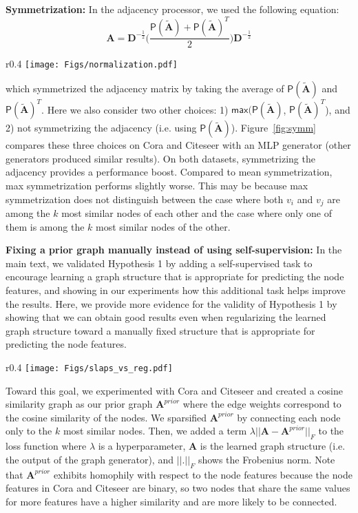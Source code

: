 \documentclass{article}
\def\mA{{\bm{A}}}
\def\mD{{\bm{D}}}
\newcommand{\func}[1]{\ensuremath{\mathsf{#1}}}
\begin{document}
\textbf{Symmetrization:} In the adjacency processor, we used the following equation:
\begin{equation*}
    \mA = \mD^{-\frac{1}{2}}\Big(\frac{\func{P}(\tilde{\mA})+\func{P}(\tilde{\mA})^T}{2}\Big)\mD^{-\frac{1}{2}} 
\end{equation*}
\begin{wrapfigure}{r}{0.4\columnwidth}
   \texttt{[image: Figs/normalization.pdf]}
   \caption{\label{fig:symm} The performance of SLAPS on Cora and Citeseer with different adjacency symmetrizations.
   }
\end{wrapfigure}
which symmetrized the adjacency matrix by taking the average of $\func{P}(\tilde{\mA})$ and $\func{P}(\tilde{\mA})^T$. Here we also consider two other choices: 1) $\func{max}(\func{P}(\tilde{\mA})$, $\func{P}(\tilde{\mA})^T$), and 2) not symmetrizing the adjacency (i.e. using $\func{P}(\tilde{\mA})$).
Figure~\ref{fig:symm} compares these three choices on Cora and Citeseer with an MLP generator (other generators produced similar results). On both datasets, symmetrizing the adjacency provides a performance boost. 
Compared to mean symmetrization, max symmetrization performs slightly worse. This may be because max symmetrization does not distinguish between the case where both $v_i$ and $v_j$ are among the $k$ most similar nodes of each other and the case where only one of them is among the $k$ most similar nodes of the other.

\textbf{Fixing a prior graph manually instead of using self-supervision:} In the main text, we validated Hypothesis 1 by adding a self-supervised task to encourage learning a graph structure that is appropriate for predicting the node features, and showing in our experiments how this additional task helps improve the results. Here, we provide more evidence for the validity of Hypothesis 1 by showing that we can obtain good results even when regularizing the learned graph structure toward a manually fixed structure that is appropriate for predicting the node features. 
\begin{wrapfigure}{r}{0.4\columnwidth}
   \texttt{[image: Figs/slaps\_vs\_reg.pdf]}
   \caption{\label{fig:slaps-vs-reg} The performance of SLAPS and regularization toward a manually defined prior structure on Cora and Citeseer when using the MLP generator.
   }
\end{wrapfigure}

Toward this goal, we experimented with Cora and Citeseer and created a cosine similarity graph as our prior graph $\mA^{prior}$ where the edge weights correspond to the cosine similarity of the nodes. We sparsified $\mA^{prior}$ by connecting each node only to the $k$ most similar nodes. Then, we added a term $\lambda || \mA - \mA^{prior} ||_F$ to the loss function where $\lambda$ is a hyperparameter, $\mA$ is the learned graph structure (i.e. the output of the graph generator), and $|| . ||_F$ shows the Frobenius norm. Note that $\mA^{prior}$ exhibits homophily with respect to the node features because the node features in Cora and Citeseer are binary, so two nodes that share the same values for more features have a higher similarity and are more likely to be connected.
\end{document}
